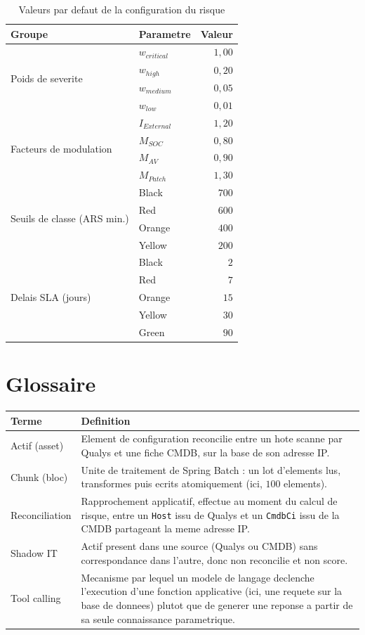 \begin{table}[H]
\centering
\caption{Valeurs par defaut de la configuration du risque}
\label{tab:defaults}
\begin{tabular}{@{}llr@{}}
\toprule
\textbf{Groupe} & \textbf{Parametre} & \textbf{Valeur} \\
\midrule
\multirow{4}{*}{Poids de severite}
 & $w_{critical}$ & $1{,}00$ \\
 & $w_{high}$ & $0{,}20$ \\
 & $w_{medium}$ & $0{,}05$ \\
 & $w_{low}$ & $0{,}01$ \\
\midrule
\multirow{4}{*}{Facteurs de modulation}
 & $I_{External}$ & $1{,}20$ \\
 & $M_{SOC}$ & $0{,}80$ \\
 & $M_{AV}$ & $0{,}90$ \\
 & $M_{Patch}$ & $1{,}30$ \\
\midrule
\multirow{4}{*}{Seuils de classe (ARS min.)}
 & Black & $700$ \\
 & Red & $600$ \\
 & Orange & $400$ \\
 & Yellow & $200$ \\
\midrule
\multirow{5}{*}{Delais SLA (jours)}
 & Black & $2$ \\
 & Red & $7$ \\
 & Orange & $15$ \\
 & Yellow & $30$ \\
 & Green & $90$ \\
\bottomrule
\end{tabular}
\end{table}

\chapter{Glossaire}

\begin{longtable}{@{}p{3.6cm}p{10.4cm}@{}}
\toprule
\textbf{Terme} & \textbf{Definition} \\
\midrule
\endhead
Actif (asset) & Element de configuration reconcilie entre un hote scanne par
Qualys et une fiche CMDB, sur la base de son adresse IP. \\
Chunk (bloc) & Unite de traitement de Spring Batch : un lot d'elements lus,
transformes puis ecrits atomiquement (ici, $100$ elements). \\
Reconciliation & Rapprochement applicatif, effectue au moment du calcul de risque,
entre un \texttt{Host} issu de Qualys et un \texttt{CmdbCi} issu de la CMDB partageant
la meme adresse IP. \\
Shadow IT & Actif present dans une source (Qualys ou CMDB) sans correspondance dans
l'autre, donc non reconcilie et non score. \\
Tool calling & Mecanisme par lequel un modele de langage declenche l'execution
d'une fonction applicative (ici, une requete sur la base de donnees) plutot que de
generer une reponse a partir de sa seule connaissance parametrique. \\
\bottomrule
\end{longtable}
